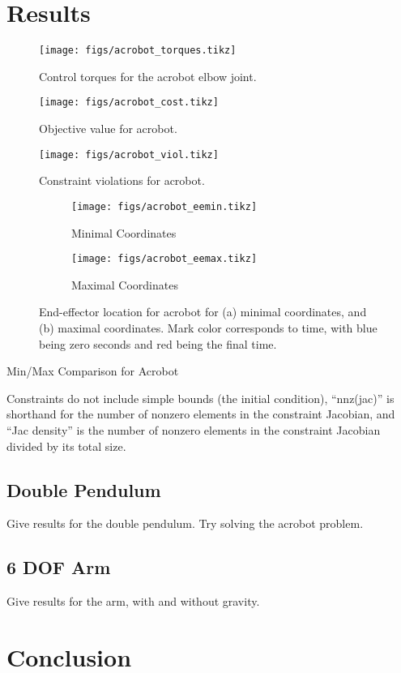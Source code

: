 \documentclass[conference]{IEEEtran}
\begin{document}
\section{Results}
\begin{figure}
    \centering
    \texttt{[image: figs/acrobot\_torques.tikz]}
    \caption{Control torques for the acrobot elbow joint.}
    \label{fig:acrobot_torques}
\end{figure}
\begin{figure}
    \centering
    \texttt{[image: figs/acrobot\_cost.tikz]}
    \caption{Objective value for acrobot.}
    \label{fig:acrobot_cost}
\end{figure}
\begin{figure}
    \centering
    \texttt{[image: figs/acrobot\_viol.tikz]}
    \caption{Constraint violations for acrobot.}
    \label{fig:acrobot_viol}
\end{figure}
\begin{figure}
    \centering
    \begin{subfigure}{0.9\columnwidth}
        \texttt{[image: figs/acrobot\_eemin.tikz]}
        \caption{Minimal Coordinates}
        \label{fig:acrobot_eemin}
    \end{subfigure}
    \begin{subfigure}{0.9\columnwidth}
        \texttt{[image: figs/acrobot\_eemax.tikz]}
        \caption{Maximal Coordinates}
        \label{fig:acrobot_eemax}
    \end{subfigure}
    \caption{End-effector location for acrobot for (a) minimal 
        coordinates, and (b) maximal coordinates. Mark color 
        corresponds to time, with blue being zero seconds and red being the final time.
    }
\end{figure}

\begin{table}
    \centering 
    \caption{Min/Max Comparison for Acrobot}
    
    \caption*{ \small
        Constraints do not include simple bounds (the initial condition), ``nnz(jac)'' 
        is shorthand for the number of nonzero elements in the constraint Jacobian, and 
        ``Jac density'' is the number of nonzero elements in the constraint Jacobian 
        divided by its total size.
    }
\end{table}


\subsection{Double Pendulum}
Give results for the double pendulum. Try solving the acrobot problem.

\subsection{6 DOF Arm}
Give results for the arm, with and without gravity. 

\section{Conclusion}

\printbibliography
\end{document}
